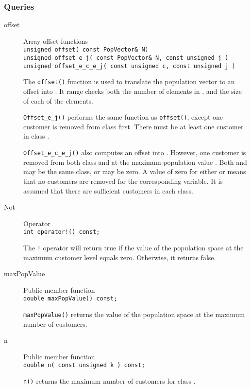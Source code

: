 \subsubsection{Queries}

\begin{description}

\item[offset] \texonly{---} Array offset functions\\
  \label{sec:population-offset}
  \texttt{unsigned offset( const PopVector\& N)}\\
  \texttt{unsigned offset\_e\_j( const PopVector\& N, const unsigned j )}\\
  \texttt{unsigned offset\_e\_c\_e\_j( const unsigned c, const unsigned j )}

  The \texttt{offset()} function is used to translate the population vector
   to an offset into .  It range checks both the
  number of elements in , and the size of each of the elements.

  \texttt{Offset\_e\_j()} performs the same function as \texttt{offset()},
  except one customer is removed from class  first.  There must
  be at least one customer in class .

  \texttt{Offset\_e\_c\_e\_j()} also computes an offset into .
  However, one customer is removed from both class  and 
  at the maximum population value
  .  Both  and 
  may be the same class, or may be zero.  A value of zero for either
   or  means that no customers are removed for the
  corresponding variable.  It is assumed that there are sufficient
  customers in each class.

\item[Not] \texonly{---} Operator\\
  \texttt{int operator!() const;}

  The \texttt{!} operator will return true if the value of the population
  space at the maximum customer level equals zero.  Otherwise, it
  returns false.

\item[maxPopValue] \texonly{---} Public member function\\
  \texttt{double maxPopValue() const;}

  \texttt{maxPopValue()} returns the value of the population space at the
  maximum number of customers.


\item[n] \texonly{---} Public member function\\
  \texttt{double n( const unsigned k ) const;}

  \texttt{n()} returns the maximum number of customers for class .

\end{description}

